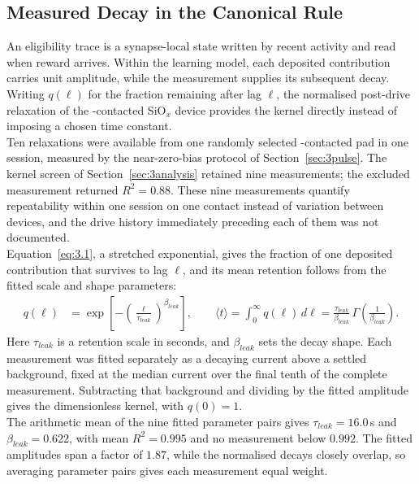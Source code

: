 \subsection[Measured Decay in the Canonical Rule]{Measured Decay in the Canonical Rule}
\label{sec:7p1p1}

\noindent An eligibility trace is a synapse-local state written by recent activity and read when reward arrives.
Within the learning model, each deposited contribution carries unit amplitude, while the measurement supplies its
subsequent decay. Writing $q(\ell)$ for the fraction remaining after lag $\ell$, the normalised post-drive relaxation
of the -contacted SiO$_x$ device provides the kernel directly instead of imposing a chosen
time constant.\\

\noindent Ten relaxations were available from one randomly selected -contacted pad in one session, measured
by the near-zero-bias protocol of Section~\ref{sec:3pulse}. The kernel screen of Section~\ref{sec:3analysis} retained nine
measurements; the excluded measurement returned $R^2=0.88$.
These nine measurements quantify repeatability within one session on one contact instead of variation between devices,
and the drive history immediately preceding each of them was not documented.\\

\noindent Equation~\ref{eq:3.1}, a stretched exponential, gives the fraction of one deposited contribution that
survives to lag $\ell$, and its mean retention
follows from the fitted scale and shape parameters:
\begin{align}
    q(\ell) &= \exp\!\left[-\left(\frac{\ell}{\tau_{leak}}\right)^{\beta_{leak}}\right], \qquad
    \langle t \rangle = \int_{0}^{\infty} q(\ell)\, d\ell = \frac{\tau_{leak}}{\beta_{leak}}\,\Gamma\!\left(\frac{1}{\beta_{leak}}\right). \label{eq:7.1}
\end{align}
\noindent Here $\tau_{leak}$ is a retention scale in seconds, and $\beta_{leak}$ sets the decay shape. Each measurement
was fitted separately as a decaying current above a settled background, fixed at the median current over the final
tenth of the complete measurement. Subtracting that background and dividing by the fitted amplitude gives the
dimensionless kernel, with $q(0)=1$.\\

\noindent The arithmetic mean of the nine fitted parameter pairs gives $\tau_{leak}=16.0$\,s and
$\beta_{leak}=0.622$, with mean $R^2=0.995$ and no measurement below $0.992$. The fitted amplitudes span a factor of
$1.87$, while the normalised decays closely overlap, so averaging parameter pairs gives each measurement equal
weight.\\

